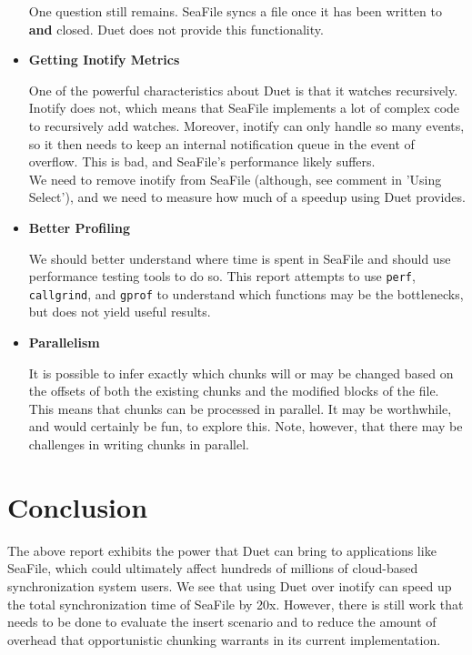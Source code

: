 \documentclass[table]{article}
\newcommand{\code}[1]{\texttt{#1}}
\begin{document}
\begin{multicols}{2}
\begin{itemize}
        One question still remains. SeaFile syncs a file once it has been written to \textbf{and} closed. Duet does not provide this functionality.
        
    \item \textbf{Getting Inotify Metrics}
    
        One of the powerful characteristics about Duet is that it watches recursively. Inotify does not, which means that SeaFile implements a lot of complex code to recursively add watches. Moreover, inotify can only handle so many events, so it then needs to keep an internal notification queue in the event of overflow. This is bad, and SeaFile's performance likely suffers.\\
        
        We need to remove inotify from SeaFile (although, see comment in 'Using Select'), and we need to measure how much of a speedup using Duet provides.
        
    \item \textbf{Better Profiling}
    
        We should better understand where time is spent in SeaFile and should use performance testing tools to do so. This report attempts to use \code{perf}, \code{callgrind}, and \code{gprof} to understand which functions may be the bottlenecks, but does not yield useful results.
        
    \item \textbf{Parallelism}

        It is possible to infer exactly which chunks will or may be changed based on the offsets of both the existing chunks and the modified blocks of the file. This means that chunks can be processed in parallel. It may be worthwhile, and would certainly be fun, to explore this. Note, however, that there may be challenges in writing chunks in parallel.

\end{itemize}

\section{Conclusion}

The above report exhibits the power that Duet can bring to applications like SeaFile, which could ultimately affect hundreds of millions of cloud-based synchronization system users. We see that using Duet over inotify can speed up the total synchronization time of SeaFile by 20x. However, there is still work that needs to be done to evaluate the insert scenario and to reduce the amount of overhead that opportunistic chunking warrants in its current implementation.


\end{multicols}
\end{document}
